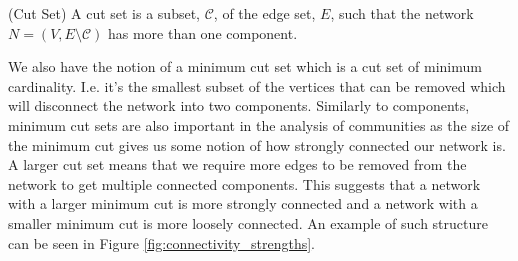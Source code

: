 \begin{definition}{(Cut Set)}
    A cut set is a subset, $\mathcal{C}$, of the edge set, $E$, such that the network $N = (V, E\setminus\mathcal{C})$ has more than one component.
\end{definition}

We also have the notion of a minimum cut set which is a cut set of minimum cardinality. I.e. it's the smallest subset of the vertices that can be removed which will disconnect the network into two components. Similarly to components, minimum cut sets are also important in the analysis of communities as the size of the minimum cut gives us some notion of how strongly connected our network is. A larger cut set means that we require more edges to be removed from the network to get multiple connected components. This suggests that a network with a larger minimum cut is more strongly connected and a network with a smaller minimum cut is more loosely connected. An example of such structure can be seen in Figure \ref{fig:connectivity_strengths}.

